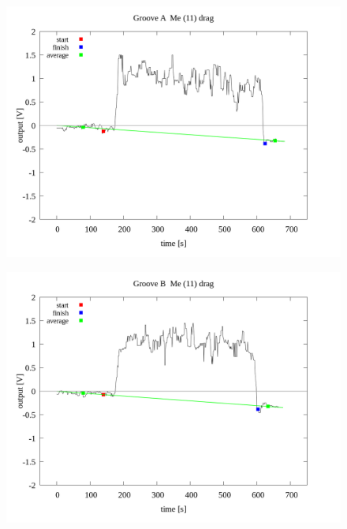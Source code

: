 \documentclass[a4paper]{jsarticle}
\begin{document}
\begin{figure}[htbp]
    \footnotesize
    \begin{center}
        \includegraphics[width=140mm]{../../../../33_result/210806/median/11/drag/03/Groove_A_me(11)_drag_03.png}
    \end{center}
\end{figure}

\begin{figure}[htbp]
    \footnotesize
    \begin{center}
        \includegraphics[width=140mm]{../../../../33_result/210806/median/11/drag/03/Groove_B_me(11)_drag_03.png}
    \end{center}
\end{figure}
\end{document}
